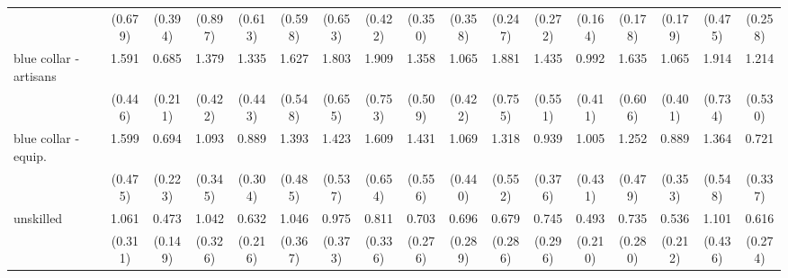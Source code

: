 {\begin{tabular}{l*{16}{c}}
                    &     (0.679)         &     (0.394)         &     (0.897)         &     (0.613)         &     (0.598)         &     (0.653)         &     (0.422)         &     (0.350)         &     (0.358)         &     (0.247)         &     (0.272)         &     (0.164)         &     (0.178)         &     (0.179)         &     (0.475)         &     (0.258)         \\
[1em]
blue collar - artisans&       1.591         &       0.685         &       1.379         &       1.335         &       1.627         &       1.803         &       1.909         &       1.358         &       1.065         &       1.881         &       1.435         &       0.992         &       1.635         &       1.065         &       1.914         &       1.214         \\
                    &     (0.446)         &     (0.211)         &     (0.422)         &     (0.443)         &     (0.548)         &     (0.655)         &     (0.753)         &     (0.509)         &     (0.422)         &     (0.755)         &     (0.551)         &     (0.411)         &     (0.606)         &     (0.401)         &     (0.734)         &     (0.530)         \\
[1em]
blue collar - equip.&       1.599         &       0.694         &       1.093         &       0.889         &       1.393         &       1.423         &       1.609         &       1.431         &       1.069         &       1.318         &       0.939         &       1.005         &       1.252         &       0.889         &       1.364         &       0.721         \\
                    &     (0.475)         &     (0.223)         &     (0.345)         &     (0.304)         &     (0.485)         &     (0.537)         &     (0.654)         &     (0.556)         &     (0.440)         &     (0.552)         &     (0.376)         &     (0.431)         &     (0.479)         &     (0.353)         &     (0.548)         &     (0.337)         \\
[1em]
unskilled           &       1.061         &       0.473\sym{*}  &       1.042         &       0.632         &       1.046         &       0.975         &       0.811         &       0.703         &       0.696         &       0.679         &       0.745         &       0.493         &       0.735         &       0.536         &       1.101         &       0.616         \\
                    &     (0.311)         &     (0.149)         &     (0.326)         &     (0.216)         &     (0.367)         &     (0.373)         &     (0.336)         &     (0.276)         &     (0.289)         &     (0.286)         &     (0.296)         &     (0.210)         &     (0.280)         &     (0.212)         &     (0.436)         &     (0.274)         \\

\end{tabular}}
